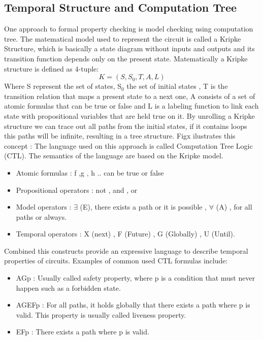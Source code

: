 \documentclass[a4paper,11pt]{article}
\begin{document}
\subsection{Temporal Structure and Computation Tree}
One approach to formal property checking is model checking using computation tree. The matematical model used to represent the circuit is called a Kripke Structure, which is basically a state diagram without inputs and outputs and its transition function depends only on the present state. Matematically a Kripke structure is defined as 4-tuple:
\begin{equation}
K = ( S , S_0 , T , A , L )
\end{equation}  
Where S represent the set of states, S$_0$ the set of initial states , T is the transition relation that maps a present state to a next one, A consists of a set of atomic formulas that can be true or false and L is a labeling function to link each state with propositional variables that are held true on it. By unrolling a Kripke structure we can trace out all paths from the initial states, if it contains loops this paths will be infinite, resulting in a tree structure. Figx ilustrates this concept :
The language used on this approach is called Computation Tree Logic (CTL). The semantics of the language are based on the Kripke model.
\begin{itemize}
\item  Atomic formulas : f ,g , h .. can be true or false
\item  Propositional operators : not  , and  , or 
\item  Model operators : $\exists$ (E), there exists a path or it is possible , $\forall$ (A) , for all paths or always. 
\item Temporal operators : X (next) , F (Future) , G (Globally) , U (Until).
\end{itemize}
Combined this constructs provide an expressive language to describe temporal properties of circuits. Examples of common used CTL formulas include:
\begin{itemize}
\item AGp : Usually called safety property, where p is a condition that must never happen such as a forbidden state.
\item AGEFp : For all paths, it holds globally that there exists a path where p is valid. This property is usually called liveness property.
\item EFp : There exists a path where p is valid. 
\end{itemize}
\end{document}
